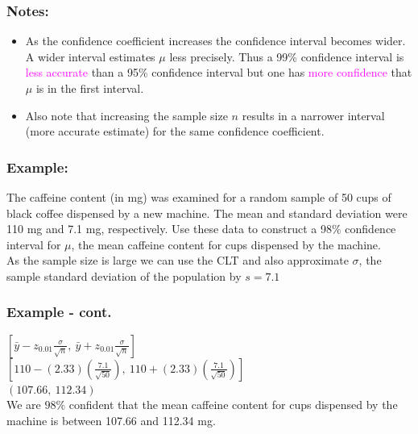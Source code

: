 \documentclass[xcolor=dvipsnames,12pt]{beamer}
\begin{document}
\begin{frame}
\frametitle{Notes:}
\begin{itemize}
\item As the confidence coefficient increases the
confidence interval becomes wider. A wider interval estimates
$\mu$ less precisely. Thus a 99\% confidence interval is \textcolor{magenta}{less accurate} than
a 95\% confidence interval but one has \textcolor{magenta}{more confidence} that $\mu$ is in the first interval.
\item Also note that increasing the sample size $n$ results in a narrower interval 
(more accurate estimate) for the same confidence coefficient.
\end{itemize}
\end{frame}


\begin{frame}
\frametitle{Example:}
The caffeine content (in mg) was examined for a random sample
of 50 cups of black coffee dispensed by a new machine. The mean and
standard deviation were 110 mg and 7.1 mg, respectively. Use these
data to construct a 98\% confidence interval for $\mu$, the mean
caffeine content for cups dispensed by the machine.\\
As the sample size is large we can use the CLT and also
approximate  $\sigma$, the sample standard deviation of the
population by $s=7.1$


\end{frame}


\begin{frame}
\frametitle{Example - cont.}
 $\left[\bar{y} - z_{0.01} \frac{\sigma}{\sqrt{n}}, \
\bar{y} + z_{0.01} \frac{\sigma}{\sqrt{n}}\right]$\\[.1in]

 $\left[110 - (2.33)\left(\frac{7.1}{\sqrt{50}}\right), \
   110 + (2.33)\left(\frac{7.1}{\sqrt{50}}\right)  \right]$\\[.1in]

 $(107.66,\ 112.34)$\\[.2in]

We are $98\%$ confident that  the mean
caffeine content for cups dispensed by the machine is between
107.66 and 112.34 mg.
\end{frame}
\end{document}
